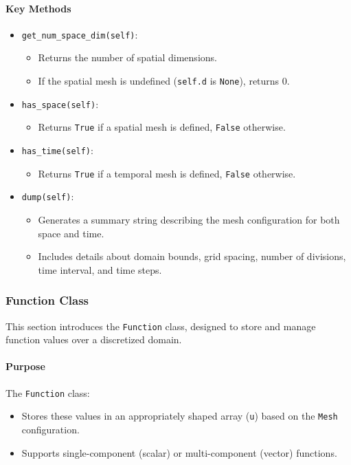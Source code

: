 \documentclass{article}
\begin{document}
			\paragraph{Key Methods}
			\begin{itemize}
				\item \texttt{get\_num\_space\_dim(self)}:
				\begin{itemize}
					\item Returns the number of spatial dimensions.
					\item If the spatial mesh is undefined (\texttt{self.d} is \texttt{None}), returns 0.
				\end{itemize}
				\item \texttt{has\_space(self)}:
				\begin{itemize}
					\item Returns \texttt{True} if a spatial mesh is defined, \texttt{False} otherwise.
				\end{itemize}
				\item \texttt{has\_time(self)}:
				\begin{itemize}
					\item Returns \texttt{True} if a temporal mesh is defined, \texttt{False} otherwise.
				\end{itemize}
				\item \texttt{dump(self)}:
				\begin{itemize}
					\item Generates a summary string describing the mesh configuration for both space and time.
					\item Includes details about domain bounds, grid spacing, number of divisions, time interval, and time steps.
				\end{itemize}
			\end{itemize}
			
		\subsubsection{Function Class }
		
			This section introduces the \texttt{Function} class, designed to store and manage function values over a discretized domain.
			
			\paragraph{Purpose}
			The \texttt{Function} class:
			\begin{itemize}
				\item Stores these values in an appropriately shaped array (\texttt{u}) based on the \texttt{Mesh} configuration.
				\item Supports single-component (scalar) or multi-component (vector) functions.
			\end{itemize}
			
\end{document}
